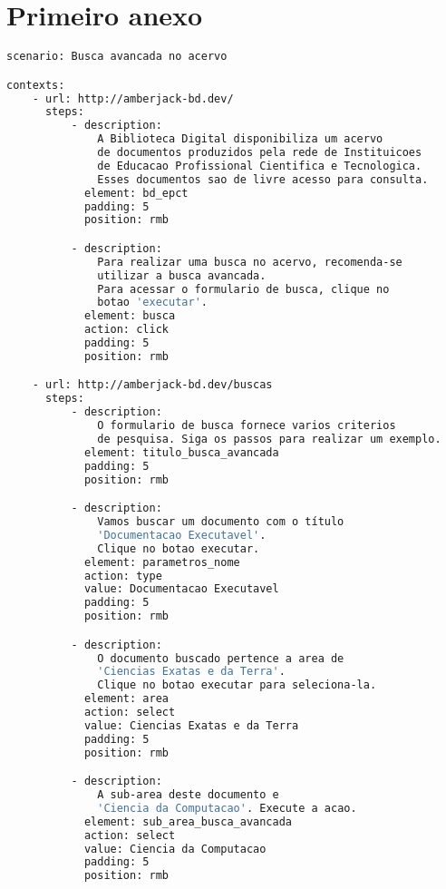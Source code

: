 \apendice \chapter{Primeiro anexo}

{\singlespace
\begin{lstlisting}[caption=Cenário descrito em YAML,language=bash,label={lst:anexo_yaml}]
scenario: Busca avancada no acervo

contexts:
    - url: http://amberjack-bd.dev/
      steps:
          - description:
              A Biblioteca Digital disponibiliza um acervo
              de documentos produzidos pela rede de Instituicoes
              de Educacao Profissional Cientifica e Tecnologica.
              Esses documentos sao de livre acesso para consulta.
            element: bd_epct
            padding: 5
            position: rmb

          - description:
              Para realizar uma busca no acervo, recomenda-se
              utilizar a busca avancada.
              Para acessar o formulario de busca, clique no
              botao 'executar'.
            element: busca
            action: click
            padding: 5
            position: rmb

    - url: http://amberjack-bd.dev/buscas
      steps:
          - description:
              O formulario de busca fornece varios criterios
              de pesquisa. Siga os passos para realizar um exemplo.
            element: titulo_busca_avancada
            padding: 5
            position: rmb

          - description:
              Vamos buscar um documento com o título
              'Documentacao Executavel'.
              Clique no botao executar.
            element: parametros_nome
            action: type
            value: Documentacao Executavel
            padding: 5
            position: rmb

          - description:
              O documento buscado pertence a area de
              'Ciencias Exatas e da Terra'.
              Clique no botao executar para seleciona-la.
            element: area
            action: select
            value: Ciencias Exatas e da Terra
            padding: 5
            position: rmb

          - description:
              A sub-area deste documento e
              'Ciencia da Computacao'. Execute a acao.
            element: sub_area_busca_avancada
            action: select
            value: Ciencia da Computacao
            padding: 5
            position: rmb


\end{lstlisting}}
